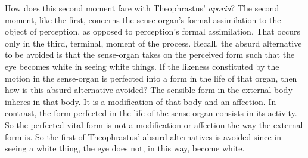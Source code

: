 \documentclass[12pt]{article}
\begin{document}
How does this second moment fare with Theophrastus' \emph{aporia}? The second moment, like the first, concerns the sense-organ's formal assimilation to the object of perception, as opposed to perception's formal assimilation. That occurs only in the third, terminal, moment of the process. Recall, the absurd alternative to be avoided is that the sense-organ takes on the perceived form such that the eye becomes white in seeing white things. If the likeness constituted by the motion in the sense-organ is perfected into a form in the life of that organ, then how is this absurd alternative avoided? The sensible form in the external body inheres in that body. It is a modification of that body and an affection. In contrast, the form perfected in the life of the sense-organ consists in its activity. So the perfected vital form is not a modification or affection the way the external form is. So the first of Theophrastus' absurd alternatives is avoided since in seeing a white thing, the eye does not, in this way, become white.
\end{document}
